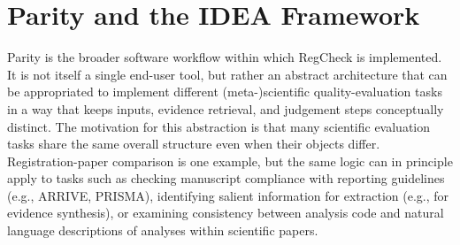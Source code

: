 \documentclass{article}
\begin{document}
\section{Parity and the IDEA Framework}
Parity is the broader software workflow within which RegCheck is implemented. It is not itself a single end-user tool, but rather an abstract architecture that can be appropriated to implement different (meta-)scientific quality-evaluation tasks in a way that keeps inputs, evidence retrieval, and judgement steps conceptually distinct. The motivation for this abstraction is that many scientific evaluation tasks share the same overall structure even when their objects differ. Registration-paper comparison is one example, but the same logic can in principle apply to tasks such as checking manuscript compliance with reporting guidelines (e.g., ARRIVE, PRISMA), identifying salient information for extraction (e.g., for evidence synthesis), or examining consistency between analysis code and natural language descriptions of analyses within scientific papers.
\end{document}
